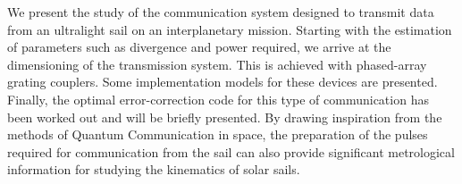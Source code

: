 \documentclass[a4paper,parskip,10pt]{scrartcl}
\begin{document}
    \vfill

    \begin{tcolorbox}[
        enhanced,
        title={Keynote Lecture 3: Paolo Villoresi (University of Padova) \\  Harnessing the light emission for extreme space optical communication},
        sharp corners,
        colbacktitle=thistrack,
        fonttitle=\large\mediumfont,
        boxsep=0pt,
        boxrule=0pt,
        left*=0pt,
        lefttitle=4mm,
        toptitle=4mm,
        bottomtitle=4mm,
        top=0pt,
        bottom=0pt,
        sidebyside,
        sidebyside align=center,
        lefthand width=6cm,
        segmentation empty,
    ]%
        
        \tcblower

        \setlength{\parskip}{1ex}
        
        \vspace{1ex}
        We present the study of the communication system designed to transmit data from an ultralight sail on an interplanetary mission. Starting with the estimation of parameters such as divergence and power required, we arrive at the dimensioning of the transmission system. This is achieved with phased-array grating couplers. Some implementation models for these devices are presented. Finally, the optimal error-correction code for this type of communication has been worked out and will be briefly presented. By drawing inspiration from the methods of Quantum Communication in space, the preparation of the pulses required for communication from the sail can also provide significant metrological information for studying the kinematics of solar sails.


\end{tcolorbox}
\end{document}
